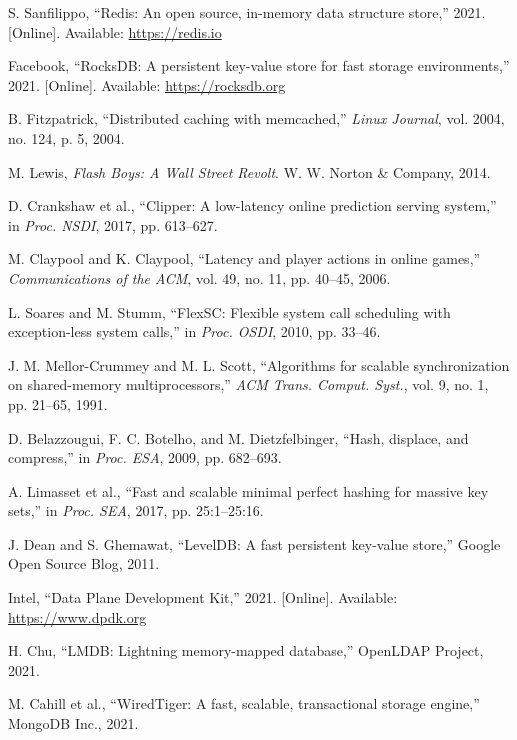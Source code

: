 \documentclass[11pt]{article}
\begin{document}
\begin{thebibliography}{99}

S. Sanfilippo, ``Redis: An open source, in-memory data structure store,'' 2021. [Online]. Available: \url{https://redis.io}

Facebook, ``RocksDB: A persistent key-value store for fast storage environments,'' 2021. [Online]. Available: \url{https://rocksdb.org}

B. Fitzpatrick, ``Distributed caching with memcached,'' \textit{Linux Journal}, vol. 2004, no. 124, p. 5, 2004.

M. Lewis, \textit{Flash Boys: A Wall Street Revolt}. W. W. Norton \& Company, 2014.

D. Crankshaw et al., ``Clipper: A low-latency online prediction serving system,'' in \textit{Proc. NSDI}, 2017, pp. 613--627.

M. Claypool and K. Claypool, ``Latency and player actions in online games,'' \textit{Communications of the ACM}, vol. 49, no. 11, pp. 40--45, 2006.

L. Soares and M. Stumm, ``FlexSC: Flexible system call scheduling with exception-less system calls,'' in \textit{Proc. OSDI}, 2010, pp. 33--46.

J. M. Mellor-Crummey and M. L. Scott, ``Algorithms for scalable synchronization on shared-memory multiprocessors,'' \textit{ACM Trans. Comput. Syst.}, vol. 9, no. 1, pp. 21--65, 1991.

D. Belazzougui, F. C. Botelho, and M. Dietzfelbinger, ``Hash, displace, and compress,'' in \textit{Proc. ESA}, 2009, pp. 682--693.

A. Limasset et al., ``Fast and scalable minimal perfect hashing for massive key sets,'' in \textit{Proc. SEA}, 2017, pp. 25:1--25:16.

J. Dean and S. Ghemawat, ``LevelDB: A fast persistent key-value store,'' Google Open Source Blog, 2011.

Intel, ``Data Plane Development Kit,'' 2021. [Online]. Available: \url{https://www.dpdk.org}

H. Chu, ``LMDB: Lightning memory-mapped database,'' OpenLDAP Project, 2021.

M. Cahill et al., ``WiredTiger: A fast, scalable, transactional storage engine,'' MongoDB Inc., 2021.


\end{thebibliography}
\end{document}
